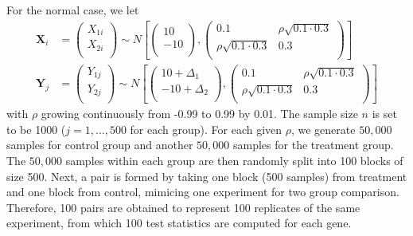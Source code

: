 \documentclass[12pt, a4paper]{article}
\begin{document}
	For the normal case, we let 
	\begin{equation}
		\begin{aligned}
			\bm X_i &=\left( \begin{array}{c}
				X_{1i}\\
				X_{2i}\\
			\end{array}\right)
			\sim N\left[
			\left(\begin{array}{c}
				10\\
				-10\\
			\end{array} \right), 
			\left(
			\begin{array}{cc}
				0.1 &\rho \sqrt{0.1\cdot 0.3} \\
				\rho \sqrt{0.1\cdot 0.3} & 	0.3 \\
			\end{array}
			\right)
			\right] \\
			\bm Y_j &= \left( \begin{array}{c}
				Y_{1j}\\
				Y_{2j}\\
			\end{array}\right)
			\sim N\left[
			\left(\begin{array}{c}
				10+ \Delta_1\\
				-10 + \Delta_2\\
			\end{array} \right), 
			\left(
			\begin{array}{cc}
				0.1 &\rho \sqrt{0.1\cdot 0.3} \\
				\rho \sqrt{0.1\cdot 0.3} & 	0.3 \\
			\end{array}
			\right)
			\right] 
		\end{aligned}
	\end{equation}
	with $\rho$ growing continuously from -0.99 to 0.99 by 0.01.  The sample size $n$ is set to be 1000
	($j =1, \ldots, 500$ for each group). For each given $\rho$, we generate $50,000$ samples for
	control group and another $50,000$ samples for the treatment group. The $50,000$ samples within each
	group are then randomly split into 100 blocks of size 500. Next, a pair is formed by taking one
	block (500 samples) from treatment and one block from control,  mimicing one experiment for two
	group comparison. Therefore, 100 pairs are obtained to represent 100 replicates of the same
	experiment, from which 100 test statistics are computed for each gene. 
	
\end{document}
